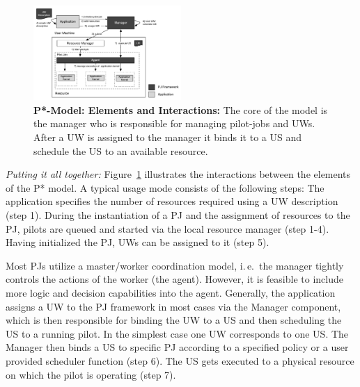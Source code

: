 \documentclass[conference,final]{IEEEtran}
\newcommand{\jhanote}[1]{ {\textcolor{red} { ***shantenu: #1 }}}
\newcommand{\jhanote}[1]{}
\newcommand{\upp}{\vspace*{-0.5em}}
\begin{document}

 

\begin{figure}[htbp]
    \centering    
    \includegraphics[width=0.5\textwidth]{figures/pstar_model.pdf}
    \caption{\textbf{P*-Model: Elements and Interactions:} The core of the model 
is the manager who is responsible for managing pilot-jobs and UWs. After a UW is 
assigned to the manager it binds it to a US and schedule the US to an available 
resource. \upp\upp}
    \label{fig:figures_pstar}
\end{figure}

{\it Putting it all together:} Figure~\ref{fig:figures_pstar} illustrates the
interactions between the elements of the P* model. A typical usage mode consists
of the following steps: The application specifies the number of resources
required using a UW description (step 1). During the instantiation of a PJ and
the assignment of resources to the PJ, pilots are queued and started via the
local resource manager (step 1-4). Having initialized the PJ, UWs can be
assigned to it (step 5).


Most PJs utilize a master/worker coordination model, i.\,e.\ the
manager tightly controls the actions of the worker (the
agent). However, it is feasible to include more logic and decision
capabilities into the agent. Generally, the application assigns a UW
to the PJ framework in most cases via the Manager component, which is
then responsible for binding the UW to a US and then scheduling the US 
to a running pilot.  In
the simplest case one UW corresponds to one US. The Manager then binds
a US to specific PJ according to a specified policy or a user provided
scheduler function (step 6). The US gets executed to a physical
resource on which the pilot is operating (step 7).
\end{document}
